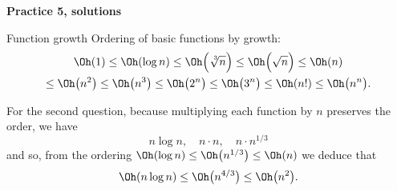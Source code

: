 \documentclass{practice}
\begin{document}
\begin{center}
  \textbf{Practice 5, solutions}
\end{center}

\begin{task}{Function growth}
  Ordering of basic functions by growth:
  \begin{multline*}
    \Oh(1) \le
    \Oh(\log n) \le
    \Oh\Bigl(\sqrt[\leftroot{-2}\uproot{2}3]{n}\Bigr) \le
    \Oh\Bigl(\sqrt{n}\Bigr) \le
    \Oh(n) \\\le
    \Oh\bigl(n^2\bigr) \le
    \Oh\bigl(n^3\bigr) \le
    \Oh\bigl(2^n\bigr) \le
    \Oh\bigl(3^n\bigr) \le
    \Oh(n!) \le
    \Oh\bigl(n^n\bigr).
  \end{multline*}

  \iffalse
  \begin{figure}[h!]
    \centering
    \begin{tikzpicture}
      \begin{axis}[
        width=10cm,
        axis lines = left,
        grid=major,
        grid style={dashed},
        xlabel=$n$,
        ylabel=Growth,
        restrict x to domain=0:10,
        restrict y to domain=0:10,
        domain=0:10,
        xmin=0,ymin=0,
        xmax=11,ymax=11,
        samples=1000
      ]
        \addplot[thick] {log2(x)}
        node[above,pos=1]{$\Oh(\log_2(n))$};
        \addplot[thick] {pow(x,1/2)}
        node[above,pos=1]{$\Oh(\sqrt(n))$};
        \addplot[thick] {x};
        \addplot[thick] {x^2};
        \addplot[thick] {2^(x)};
        \addplot[thick] gnuplot{gamma(x+1)};
      \end{axis}
    \end{tikzpicture}
  \end{figure}
  \fi

  For the second question, because multiplying each function by $n$ preserves the order, we have
  \[
    n \log n,\quad
    n\cdot n,\quad
    n\cdot n^{1/3}
  \]
  and so, from the ordering $\Oh(\log n) \le \Oh\bigl(n^{1/3}\bigr) \le \Oh(n)$
  we deduce that
  \[
    \Oh(n\log n) \le \Oh\bigl(n^{4/3}\bigr) \le \Oh\bigl(n^2\bigr).
  \]
\end{task}
\end{document}
